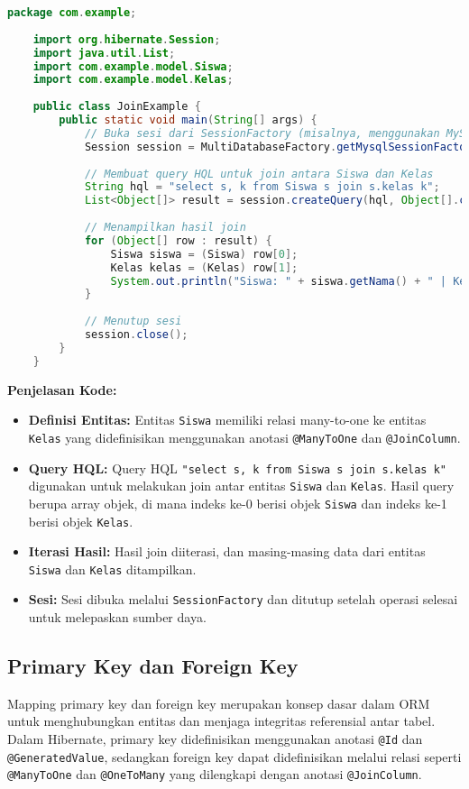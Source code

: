 \begin{lstlisting}[language=Java, style=JavaStyle]
	package com.example;
	
	import org.hibernate.Session;
	import java.util.List;
	import com.example.model.Siswa;
	import com.example.model.Kelas;
	
	public class JoinExample {
		public static void main(String[] args) {
			// Buka sesi dari SessionFactory (misalnya, menggunakan MySQL)
			Session session = MultiDatabaseFactory.getMysqlSessionFactory().openSession();
			
			// Membuat query HQL untuk join antara Siswa dan Kelas
			String hql = "select s, k from Siswa s join s.kelas k";
			List<Object[]> result = session.createQuery(hql, Object[].class).list();
			
			// Menampilkan hasil join
			for (Object[] row : result) {
				Siswa siswa = (Siswa) row[0];
				Kelas kelas = (Kelas) row[1];
				System.out.println("Siswa: " + siswa.getNama() + " | Kelas: " + kelas.getNamaKelas());
			}
			
			// Menutup sesi
			session.close();
		}
	}
\end{lstlisting}

\textbf{Penjelasan Kode:}
\begin{itemize}
	\item \textbf{Definisi Entitas:} Entitas \texttt{Siswa} memiliki relasi many-to-one ke entitas \texttt{Kelas} yang didefinisikan menggunakan anotasi \texttt{@ManyToOne} dan \texttt{@JoinColumn}.
	\item \textbf{Query HQL:} Query HQL \texttt{"select s, k from Siswa s join s.kelas k"} digunakan untuk melakukan join antar entitas \texttt{Siswa} dan \texttt{Kelas}. Hasil query berupa array objek, di mana indeks ke-0 berisi objek \texttt{Siswa} dan indeks ke-1 berisi objek \texttt{Kelas}.
	\item \textbf{Iterasi Hasil:} Hasil join diiterasi, dan masing-masing data dari entitas \texttt{Siswa} dan \texttt{Kelas} ditampilkan.
	\item \textbf{Sesi:} Sesi dibuka melalui \texttt{SessionFactory} dan ditutup setelah operasi selesai untuk melepaskan sumber daya.
\end{itemize}

\subsection{Primary Key dan Foreign Key}

Mapping primary key dan foreign key merupakan konsep dasar dalam ORM untuk menghubungkan entitas dan menjaga integritas referensial antar tabel. Dalam Hibernate, primary key didefinisikan menggunakan anotasi \texttt{@Id} dan \texttt{@GeneratedValue}, sedangkan foreign key dapat didefinisikan melalui relasi seperti \texttt{@ManyToOne} dan \texttt{@OneToMany} yang dilengkapi dengan anotasi \texttt{@JoinColumn}.


